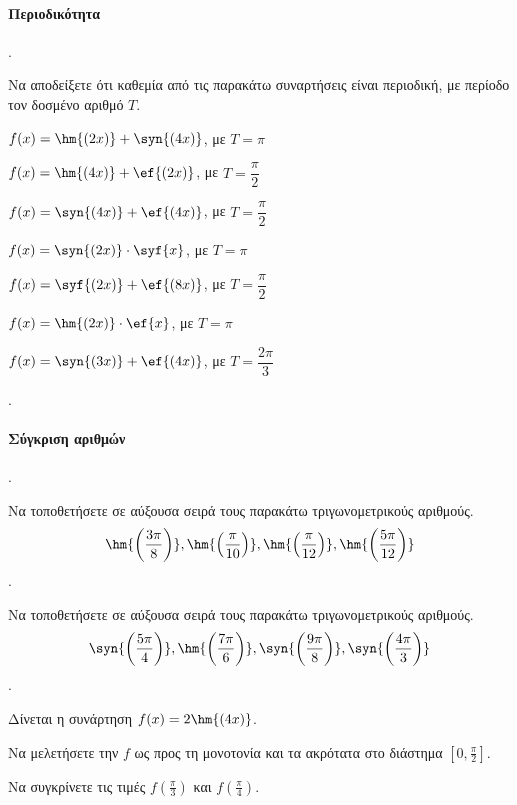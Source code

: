 \documentclass[11pt,a4paper,twocolumn]{article}
\newcounter{askhsh}
\newcommand{\askhsh}{\large\theaskhsh.\ \addtocounter{askhsh}{1}}
\begin{document}
\paragraph{Περιοδικότητα}
\askhsh Να αποδείξετε ότι καθεμία από τις παρακάτω συναρτήσεις είναι περιοδική, με περίοδο τον δοσμένο αριθμό $T$.
\begin{alist}
\item $f(x)=\hm{(2x)}+\syn{(4x)}$, με $T=\pi$
\item $f(x)=\hm{(4x)}+\ef{(2x)}$, με $T=\dfrac{\pi}{2}$
\item $f(x)=\syn{(4x)}+\ef{(4x)}$, με $T=\dfrac{\pi}{2}$
\item $f(x)=\syn{(2x)}\cdot\syf{x}$, με $T=\pi$
\item $f(x)=\syf{(2x)}+\ef{(8x)}$, με $T=\dfrac{\pi}{2}$
\item $f(x)=\hm{(2x)}\cdot\ef{x}$, με $T=\pi$
\item $f(x)=\syn{(3x)}+\ef{(4x)}$, με $T=\dfrac{2\pi}{3}$
\end{alist}
\askhsh
\paragraph{Σύγκριση αριθμών}
\askhsh Να τοποθετήσετε σε αύξουσα σειρά τους παρακάτω τριγωνομετρικούς αριθμούς.
\[ \hm{\left(\dfrac{3\pi}{8}\right)},\hm{\left(\dfrac{\pi}{10}\right)},\hm{\left(\dfrac{\pi}{12}\right)},\hm{\left(\dfrac{5\pi}{12}\right)} \]
\askhsh Να τοποθετήσετε σε αύξουσα σειρά τους παρακάτω τριγωνομετρικούς αριθμούς.
\[ \syn{\left(\dfrac{5\pi}{4}\right)},\hm{\left(\dfrac{7\pi}{6}\right)},\syn{\left(\dfrac{9\pi}{8}\right)},\syn{\left(\dfrac{4\pi}{3}\right)} \]
\askhsh Δίνεται η συνάρτηση $f(x)=2\hm{(4x)}$.
\begin{alist}
\item Να μελετήσετε την $f$ ως προς τη μονοτονία και τα ακρότατα στο διάστημα $\left[0,\frac{\pi}{2}\right]$.
\item Να συγκρίνετε τις τιμές $f\left(\frac{\pi}{3}\right)$ και $f\left(\frac{\pi}{4}\right)$.
\end{alist}
\end{document}
